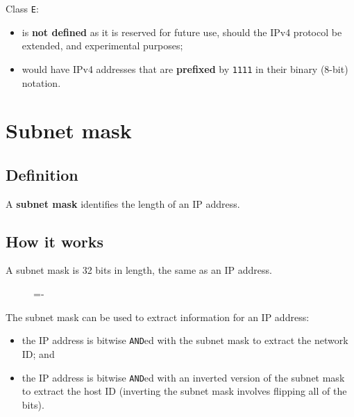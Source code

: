 \documentclass[a4paper]{systems-software}
\begin{document}
Class \texttt{E}:
\begin{itemize}
	\item is \textbf{not defined} as it is reserved for future use, should the IPv4 protocol be extended, and experimental purposes;
	\item would have IPv4 addresses that are \textbf{prefixed} by \texttt{1111} in their binary (8-bit) notation.
\end{itemize}


\newpage

\section*{Subnet mask}

\subsection*{Definition}

A \textbf{subnet mask} identifies the length of an IP address.


\subsection*{How it works}

A subnet mask is 32 bits in length, the same as an IP address.

\begin{figure}[H]
	\lineskip=-\fboxrule
\end{figure}

The subnet mask can be used to extract information for an IP address:
\begin{itemize}
	\item the IP address is bitwise \texttt{AND}ed with the subnet mask to extract the network ID; and
	\item the IP address is bitwise \texttt{AND}ed with an inverted version of the subnet mask to extract the host ID (inverting the subnet mask involves flipping all of the bits).
\end{itemize}
\end{document}
